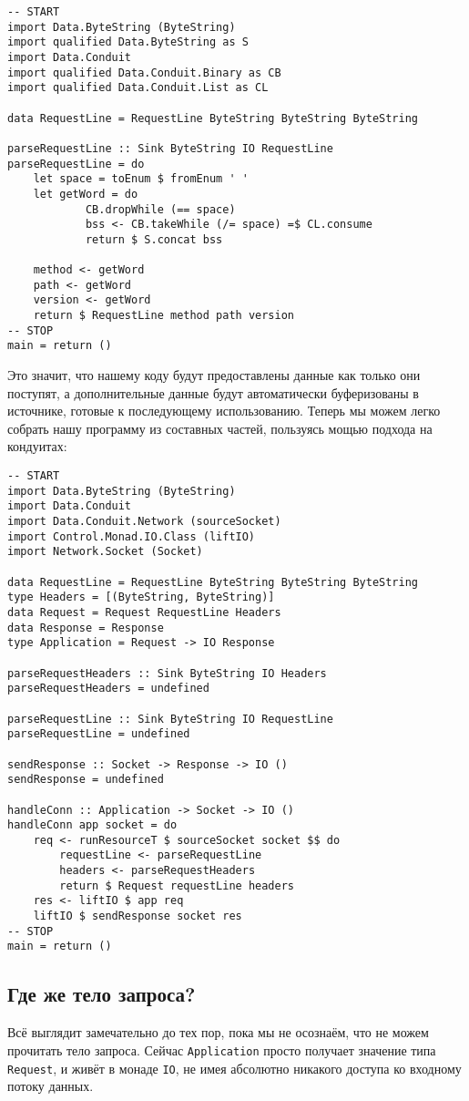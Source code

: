 \begin{lstlisting}
-- START
import Data.ByteString (ByteString)
import qualified Data.ByteString as S
import Data.Conduit
import qualified Data.Conduit.Binary as CB
import qualified Data.Conduit.List as CL

data RequestLine = RequestLine ByteString ByteString ByteString

parseRequestLine :: Sink ByteString IO RequestLine
parseRequestLine = do
    let space = toEnum $ fromEnum ' '
    let getWord = do
            CB.dropWhile (== space)
            bss <- CB.takeWhile (/= space) =$ CL.consume
            return $ S.concat bss

    method <- getWord
    path <- getWord
    version <- getWord
    return $ RequestLine method path version
-- STOP
main = return ()
\end{lstlisting}
Это значит, что нашему коду будут предоставлены данные как только они поступят,
а дополнительные данные будут автоматически буферизованы в источнике, 
готовые к последующему использованию. Теперь мы можем легко собрать нашу программу 
из составных частей, пользуясь мощью подхода на кондуитах:
\begin{lstlisting}
-- START
import Data.ByteString (ByteString)
import Data.Conduit
import Data.Conduit.Network (sourceSocket)
import Control.Monad.IO.Class (liftIO)
import Network.Socket (Socket)

data RequestLine = RequestLine ByteString ByteString ByteString
type Headers = [(ByteString, ByteString)]
data Request = Request RequestLine Headers
data Response = Response
type Application = Request -> IO Response

parseRequestHeaders :: Sink ByteString IO Headers
parseRequestHeaders = undefined

parseRequestLine :: Sink ByteString IO RequestLine
parseRequestLine = undefined

sendResponse :: Socket -> Response -> IO ()
sendResponse = undefined

handleConn :: Application -> Socket -> IO ()
handleConn app socket = do
    req <- runResourceT $ sourceSocket socket $$ do
        requestLine <- parseRequestLine
        headers <- parseRequestHeaders
        return $ Request requestLine headers
    res <- liftIO $ app req
    liftIO $ sendResponse socket res
-- STOP
main = return ()
\end{lstlisting}
\subsection{Где же тело запроса?}
Всё выглядит замечательно до тех пор, пока мы не осознаём, что не можем прочитать тело запроса.
Сейчас
\lstinline{Application} просто получает значение типа \lstinline'Request', и живёт
в монаде \lstinline'IO', не имея абсолютно никакого 
доступа ко входному потоку данных.

